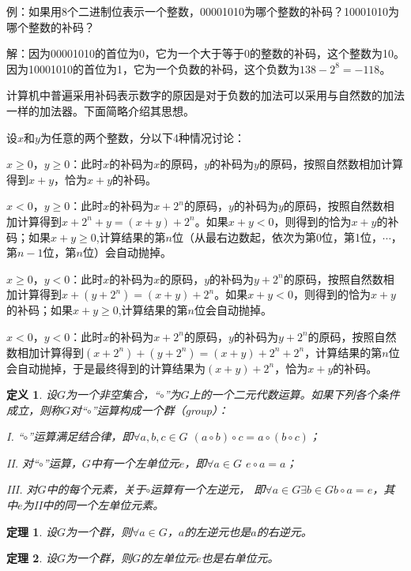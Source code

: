 \documentclass{article}
\newtheorem{Def}{定义}
\newtheorem{Thm}{定理}
\begin{document}
\begin{CJK*}{UTF8}{gbsn}
例：如果用8个二进制位表示一个整数，00001010为哪个整数的补码？10001010为哪个整数的补码？

解：因为00001010的首位为0，它为一个大于等于0的整数的补码，这个整数为10。因为10001010的首位为1，它为一个负数的补码，这个负数为$138-2^8=-118$。

计算机中普遍采用补码表示数字的原因是对于负数的加法可以采用与自然数的加法一样的加法器。下面简略介绍其思想。

设$x$和$y$为任意的两个整数，分以下4种情况讨论：

$x\geq 0$，$y\geq 0$：此时$x$的补码为$x$的原码，$y$的补码为$y$的原码，按照自然数相加计算得到$x+y$，恰为$x+y$的补码。

$x < 0$，$y \geq 0$：此时$x$的补码为$x+2^n$的原码，$y$的补码为$y$的原码，按照自然数相加计算得到$x+2^n+y=(x+y)+2^n$。如果$x+y<0$，则得到的恰为$x+y$的补码；如果$x+y\geq0$,计算结果的第$n$位（从最右边数起，依次为第0位，第1位，$\cdots$，第$n-1$位，第$n$位）会自动抛掉。

$x \geq 0$，$y < 0$：此时$x$的补码为$x$的原码，$y$的补码为$y+2^n$的原码，按照自然数相加计算得到$x+(y+2^n)=(x+y)+2^n$。如果$x+y<0$，则得到的恰为$x+y$的补码；如果$x+y\geq0$,计算结果的第$n$位会自动抛掉。

$x < 0$，$y < 0$：此时$x$的补码为$x+2^n$的原码，$y$的补码为$y+2^n$的原码，按照自然数相加计算得到$(x+2^n)+(y+2^n)=(x+y)+2^n + 2^n$，计算结果的第$n$位会自动抛掉，于是最终得到的计算结果为$(x+y)+2^n$，恰为$x+y$的补码。

\begin{Def}
  设$G$为一个非空集合，“$\circ$”为$G$上的一个二元代数运算。如果下列各个条件成立，则称$G$对“$\circ$”运算构成一个群（group）：

  I. “$\circ$”运算满足结合律，即$\forall a,b,c \in G$ $(a\circ b)\circ c = a\circ(b\circ c)$；

  II. 对“$\circ$”运算，$G$中有一个左单位元$e$，即$\forall a\in G$ $e\circ a = a$；

  III. 对$G$中的每个元素，关于$\circ$运算有一个左逆元，
  即$\forall a\in G \exists b\in G b\circ a = e$，其中$e$为II中的同一个左单位元素。
\end{Def}

\begin{Thm}
  设$G$为一个群，则$\forall a\in G$，$a$的左逆元也是$a$的右逆元。
\end{Thm}

\begin{Thm}
  设$G$为一个群，则$G$的左单位元$e$也是右单位元。
\end{Thm}


\end{CJK*}
\end{document}
